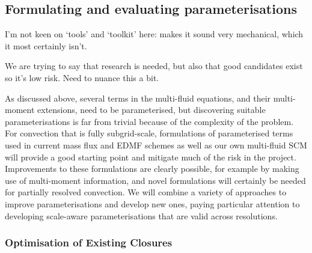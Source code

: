 \documentclass[11pt,a4paper]{article}
\begin{document}
\subsection{Formulating and evaluating parameterisations}
\label{sec:tools}




{\color{red} I'm not keen on `tools' and `toolkit' here: makes it sound very mechanical, which it
most certainly isn't.}

{\color{red} We are trying to say that research is needed, but also that good candidates exist so it's low risk. Need to nuance this a bit.}


As discussed above, several terms in the multi-fluid equations, and their multi-moment extensions, need to be parameterised, but discovering suitable parameterisations is far from trivial because of the complexity of the problem.
For convection that is fully subgrid-scale, formulations of parameterised terms used in current mass flux and EDMF schemes as well as our own multi-fluid SCM will provide a good starting point and mitigate much of the risk in the project. Improvements to these formulations are clearly possible, for example by making use of multi-moment information, and novel formulations will certainly be needed for partially resolved convection. We will combine a variety of approaches to improve parameterisations and develop new ones, paying particular attention to developing scale-aware parameterisations that are valid across resolutions.



\subsubsection*{Optimisation of Existing Closures}
\end{document}
